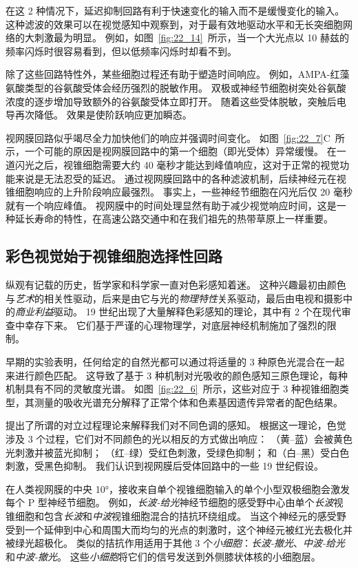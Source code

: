 在这 2 种情况下，延迟抑制回路有利于快速变化的输入而不是缓慢变化的输入。
这种滤波的效果可以在视觉感知中观察到，对于最有效地驱动水平和无长突细胞网络的大刺激最为明显。
例如，如图~\ref{fig:22_14}~所示，当一个大光点以 10 赫兹的频率闪烁时很容易看到，但以低频率闪烁时却看不到。


除了这些回路特性外，某些细胞过程还有助于塑造时间响应。
例如，AMPA-红藻氨酸类型的谷氨酸受体会经历强烈的脱敏作用。
双极或神经节细胞树突处谷氨酸浓度的逐步增加导致额外的谷氨酸受体立即打开。
随着这些受体脱敏，突触后电导再次降低。
效果是使阶跃响应更加瞬态。


视网膜回路似乎竭尽全力加快他们的响应并强调时间变化。
如图~\ref{fig:22_7}C~所示，一个可能的原因是视网膜回路中的第一个细胞（即光受体）异常缓慢。
在一道闪光之后，视锥细胞需要大约 40 毫秒才能达到峰值响应，这对于正常的视觉功能来说是无法忍受的延迟。
通过视网膜回路中的各种滤波机制，后续神经元在视锥细胞响应的上升阶段响应最强烈。
事实上，一些神经节细胞在闪光后仅 20 毫秒就有一个响应峰值。
视网膜中的时间处理显然有助于减少视觉响应时间，这是一种延长寿命的特性，在高速公路交通中和在我们祖先的热带草原上一样重要。



\subsection{彩色视觉始于视锥细胞选择性回路}

纵观有记载的历史，哲学家和科学家一直对色彩感知着迷。
这种兴趣最初由颜色与\textit{艺术}的相关性驱动，后来是由它与光的\textit{物理特性}关系驱动，最后由电视和摄影中的\textit{商业利益}驱动。
19 世纪出现了大量解释色彩感知的理论，其中有 2 个在现代审查中幸存下来。
它们基于严谨的心理物理学，对底层神经机制施加了强烈的限制。


早期的实验表明，任何给定的自然光都可以通过将适量的 3 种原色光混合在一起来进行颜色匹配。
这导致了基于 3 种机制对光吸收的颜色感知三原色理论，每种机制具有不同的灵敏度光谱。
如图~\ref{fig:22_6}~所示，这些对应于 3 种视锥细胞类型，其测量的吸收光谱充分解释了正常个体和色素基因遗传异常者的配色结果。


提出了所谓的对立过程理论来解释我们对不同色调的感知。
根据这一理论，色觉涉及 3 个过程，它们对不同颜色的光以相反的方式做出响应：
（黄–蓝）会被黄色光刺激并被蓝光抑制；
（红–绿）受红色刺激，受绿色抑制；
和（白–黑）受白色刺激，受黑色抑制。
我们认识到视网膜后受体回路中的一些 19 世纪假设。


在人类视网膜的中央 10°，接收来自单个视锥细胞输入的单个小型双极细胞会激发每个 P 型神经节细胞。
例如，\textit{长波-给光}神经节细胞的感受野中心由单个\textit{长波}视锥细胞和包含\textit{长波}和\textit{中波}视锥细胞混合的拮抗环绕组成。
当这个神经元的感受野受到一个延伸到中心和周围大而均匀的光点的刺激时，这个神经元被红光去极化并被绿光超极化。
类似的拮抗作用适用于其他 3 个\textit{小细胞}：\textit{长波-撤光}、\textit{中波-给光}和\textit{中波-撤光}。
这些\textit{小细胞}将它们的信号发送到外侧膝状体核的小细胞层。


